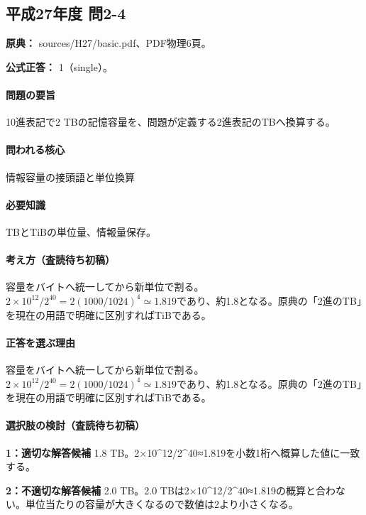 \subsection{平成27年度 問2-4}
\label{q:h27-reg-basic-2-4}

\noindent\textbf{原典：} sources/H27/basic.pdf、PDF物理6頁。

\textbf{公式正答：} 1（single）。

\paragraph{問題の要旨} 10進表記で2 TBの記憶容量を、問題が定義する2進表記のTBへ換算する。

\paragraph{問われる核心} 情報容量の接頭語と単位換算

\paragraph{必要知識} TBとTiBの単位量、情報量保存。

\paragraph{考え方（査読待ち初稿）} 容量をバイトへ統一してから新単位で割る。\(2\times10^{12}/2^{40}=2(1000/1024)^4\simeq1.819\)であり、約1.8となる。原典の「2進のTB」を現在の用語で明確に区別すればTiBである。

\paragraph{正答を選ぶ理由} 容量をバイトへ統一してから新単位で割る。\(2\times10^{12}/2^{40}=2(1000/1024)^4\simeq1.819\)であり、約1.8となる。原典の「2進のTB」を現在の用語で明確に区別すればTiBである。

\paragraph{選択肢の検討（査読待ち初稿）}\mbox{}\par

\noindent\textbf{1：適切な解答候補} 1.8 TB。2×10\textasciicircum{}12/2\textasciicircum{}40≈1.819を小数1桁へ概算した値に一致する。\par

\noindent\textbf{2：不適切な解答候補} 2.0 TB。2.0 TBは2×10\textasciicircum{}12/2\textasciicircum{}40≈1.819の概算と合わない。単位当たりの容量が大きくなるので数値は2より小さくなる。\par

